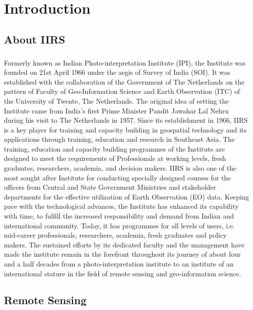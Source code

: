 \documentclass[12pt, a4paper]{report}
\begin{document}
\tableofcontents
\newpage

\setcounter{page}{1}
\setcounter{secnumdepth}{1}
\chapter{Introduction}
\section{About IIRS}
\paragraph{}
Formerly known as Indian Photo-interpretation Institute (IPI), the Institute was founded on 21st April 1966 under the aegis of Survey of India (SOI). It was established with the collaboration of the Government of The Netherlands on the pattern of Faculty of Geo-Information Science and Earth Observation (ITC) of the University of Twente, The Netherlands. The original idea of setting the Institute came from India's first Prime Minister Pandit Jawahar Lal Nehru during his visit to The Netherlands in 1957. Since its establishment in 1966, IIRS is a key player for training and capacity building in geospatial technology and its applications through training, education and research in Southeast Asia. The training, education and capacity building programmes of the Institute are designed to meet the requirements of Professionals at working levels, fresh graduates, researchers, academia, and decision makers. IIRS is also one of the most sought after Institute for conducting specially designed courses for the officers from Central and State Government Ministries and stakeholder departments for the effective utilization of Earth Observation (EO) data. Keeping pace with the technological advances, the Institute has enhanced its capability with time, to fulfill the increased responsibility and demand from Indian and international community. Today, it has programmes for all levels of users, i.e. mid-career professionals, researchers, academia, fresh graduates and policy makers. The sustained efforts by its dedicated faculty and the management have made the institute remain in the forefront throughout its journey of about four and a half decades from a photo-interpretation institute to an institute of an international stature in the field of remote sensing and geo-information science.\cite{iirs.about.history}\cite{iirs.about.instiprof}
\section{Remote Sensing}
\end{document}
